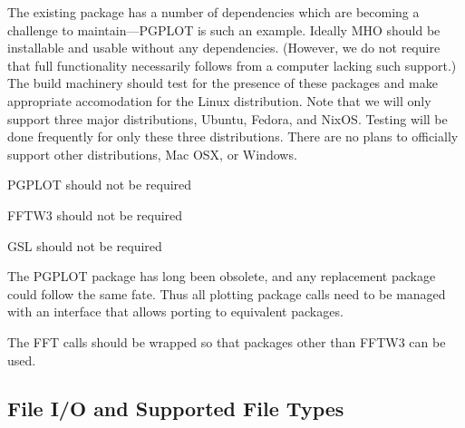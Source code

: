 The existing package has a number of dependencies which are becoming
a challenge to maintain---\acs{PGPLOT} is such an example.  Ideally
\acs{MHO} should be installable and usable without any dependencies.
(However, we do not require that full functionality necessarily follows
from a computer lacking such support.)  The build machinery should test
for the presence of these packages and make appropriate accomodation for
the Linux distribution. Note that we will only support three major distributions,
Ubuntu, Fedora, and NixOS. Testing will be done frequently for only these
three distributions. There are no plans to officially support other 
distributions, Mac OSX, or Windows.

\begin{description}

 \acs{PGPLOT} should not be required

 \acs{FFTW3} should not be required
    
 \acs{GSL} should not be required
    
 The \acs{PGPLOT} package has long been obsolete, and any replacement
    package could follow the same fate.  Thus all plotting package calls
    need to be managed with an interface that allows porting to equivalent
    packages.
    
 The \ac{FFT} calls should be wrapped so that packages other than
    \acs{FFTW3} can be used.
    
\end{description}






\subsection{File I/O and Supported File Types}
\label{sec:ioreq}

